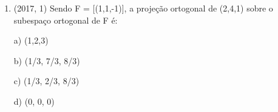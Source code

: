\documentclass{article}
\begin{document}
\begin{enumerate}
A= $\Bigg(
    \begin{array}{ccc}
    -4  & 5 & 17\\
    4 & -5 &  -4\\
    1 & 2 & -1\\
\end{array}\Bigg)$\newline

c)$A^{-1}=\Bigg(
    \begin{array}{cccc}
    -4 & 5 & 17\\
    4 & -5 & -4\\
    1 & 2 & -1 \\
\end{array}\Bigg)$\\\newline



\textbf{CONTEÚDO}

$\rule[1cm]{100cm}{1px}$

(1 / sobre a matriz determinante A . matriz dos cofatores A)$^{transposta}$

COFATOR:$A_{ij}=(-1)^{i+j}.D_{ij}$

Devemos compreender os elementos dessa expressão. O valor $A_{ij}$ é justamente o cofator do elemento aij da matriz A, enquanto que $D_{ij}$ será o determinante da matriz obtida através da matriz A, entretanto você deverá excluir da matriz A os elementos da linha i e da coluna j. Façamos um exemplo para melhor compreensão dessa expressão do cofator.\newline

TRANSPOSTA:Determinar a transposta de uma matriz é reescrevê-la de forma que suas linhas e colunas troquem de posições ordenadamente, isto é, a primeira linha é reescrita como a primeira coluna, a segunda linha é reescrita como a segunda coluna e assim por diante, até que se termine de reescrever todas as linhas na forma de coluna.




\newpage





\item (2017, 1) Sendo F = [(1,1,-1)], a projeção ortogonal de (2,4,1) sobre o subespaço ortogonal
de F é:

a) (1,2,3)

b) (1/3, 7/3, 8/3)

c) (1/3, 2/3, 8/3)

d) (0, 0, 0)


\end{enumerate}
\end{document}
